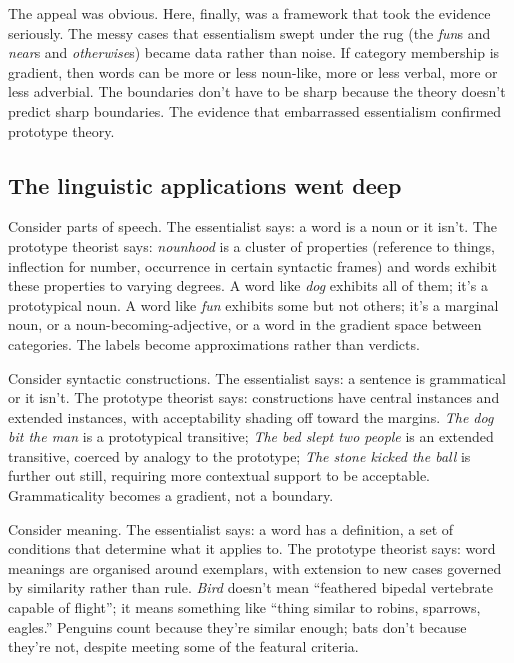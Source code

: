 The appeal was obvious. Here, finally, was a framework that took the evidence seriously. The messy cases that essentialism swept under the rug (the \textit{fun}s and \textit{near}s and \textit{otherwise}s) became data rather than noise. If category membership is gradient, then words can be more or less noun-like, more or less verbal, more or less adverbial. The boundaries don't have to be sharp because the theory doesn't predict sharp boundaries. The evidence that embarrassed essentialism confirmed prototype theory.

\subsection*{The linguistic applications went deep}

Consider parts of speech. The essentialist says: a word is a noun or it isn't. The prototype theorist says: \textit{nounhood} is a cluster of properties (reference to things, inflection for number, occurrence in certain syntactic frames) and words exhibit these properties to varying degrees. A word like \textit{dog} exhibits all of them; it's a prototypical noun. A word like \textit{fun} exhibits some but not others; it's a marginal noun, or a noun-becoming-adjective, or a word in the gradient space between categories. The labels become approximations rather than verdicts.

Consider syntactic constructions. The essentialist says: a sentence is grammatical or it isn't. The prototype theorist says: constructions have central instances and extended instances, with acceptability shading off toward the margins. \textit{The dog bit the man} is a prototypical transitive; \textit{The bed slept two people} is an extended transitive, coerced by analogy to the prototype; \textit{The stone kicked the ball} is further out still, requiring more contextual support to be acceptable. Grammaticality becomes a gradient, not a boundary.

Consider meaning. The essentialist says: a word has a definition, a set of conditions that determine what it applies to. The prototype theorist says: word meanings are organised around exemplars, with extension to new cases governed by similarity rather than rule. \textit{Bird} doesn't mean \enquote{feathered bipedal vertebrate capable of flight}; it means something like \enquote{thing similar to robins, sparrows, eagles.} Penguins count because they're similar enough; bats don't because they're not, despite meeting some of the featural criteria.

